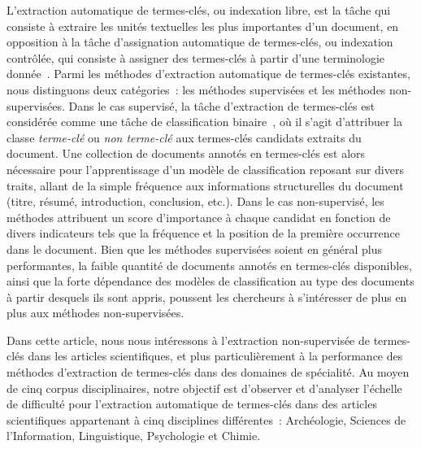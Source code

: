   L'extraction automatique de termes-clés, ou indexation libre, est la tâche qui
  consiste à extraire les unités textuelles les plus importantes d'un document,
  en opposition à la tâche d'assignation automatique de termes-clés, ou
  indexation contrôlée, qui consiste à assigner des termes-clés à partir d'une
  terminologie donnée~\cite{paroubek2012deft}. Parmi les méthodes d'extraction
  automatique de termes-clés existantes, nous distinguons deux catégories~: les
  méthodes supervisées et les méthodes non-supervisées. Dans le cas supervisé,
  la tâche d'extraction de termes-clés est considérée comme une tâche de
  classification binaire~\cite{witten1999kea}, où il s'agit d'attribuer la
  classe \og{}\textit{terme-clé}\fg{} ou \og{}\textit{non terme-clé}\fg{} aux
  termes-clés candidats extraits du document. Une collection de documents
  annotés en termes-clés est alors nécessaire pour l'apprentissage d'un modèle
  de classification reposant sur divers traits, allant de la simple fréquence
  aux informations structurelles du document (titre, résumé, introduction,
  conclusion, etc.). Dans le cas non-supervisé, les méthodes attribuent un
  score d'importance à chaque candidat en fonction de divers indicateurs tels
  que la fréquence et la position de la première occurrence dans le document.
  Bien que les méthodes supervisées soient en général plus performantes, la
  faible quantité de documents annotés en termes-clés disponibles, ainsi que la
  forte dépendance des modèles de classification au type des documents à partir
  desquels ils sont appris, poussent les chercheurs à s'intéresser de plus en
  plus aux méthodes non-supervisées.

  Dans cette article, nous nous intéressons à l'extraction non-supervisée de
  termes-clés dans les articles scientifiques, et plus particulièrement à la
  performance des méthodes d'extraction de termes-clés dans des domaines de
  spécialité. Au moyen de cinq corpus disciplinaires, notre objectif est
  d'observer et d'analyser l'échelle de difficulté pour l'extraction
  automatique de termes-clés dans des articles scientifiques appartenant à cinq
  disciplines différentes~: Archéologie, Sciences de l'Information,
  Linguistique, Psychologie et Chimie.

